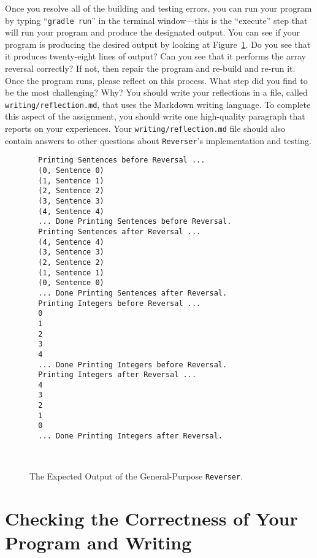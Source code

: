 \documentclass[11pt]{article}
\newcommand{\mainprogram}{\lstinline{Reverser}}
\newcommand{\mainprogramoutput}{twenty-eight}
\newcommand{\reflection}{\lstinline{writing/reflection.md}}
\newcommand{\gradlerun}{\command{gradle run}}
\newcommand{\command}[1]{``\lstinline{#1}''}
\begin{document}

Once you resolve all of the building and testing errors, you can run your
program by typing \gradlerun{} in the terminal window---this is the ``execute''
step that will run your program and produce the designated output. You can see
if your program is producing the desired output by looking at
Figure~\ref{fig:output}. Do you see that it produces \mainprogramoutput{} lines
of output? Can you see that it performs the array reversal correctly? If not,
then repair the program and re-build and re-run it. Once the program runs,
please reflect on this process. What step did you find to be the most
challenging? Why? You should write your reflections in a file, called
\reflection{}, that uses the Markdown writing language. To complete this aspect
of the assignment, you should write one high-quality paragraph that reports on
your experiences. Your \reflection{} file should also contain answers to other
questions about \mainprogram{}'s implementation and testing.

\begin{figure}[t]
  \centering
  \begin{verbatim}
  Printing Sentences before Reversal ...
  (0, Sentence 0)
  (1, Sentence 1)
  (2, Sentence 2)
  (3, Sentence 3)
  (4, Sentence 4)
  ... Done Printing Sentences before Reversal.
  Printing Sentences after Reversal ...
  (4, Sentence 4)
  (3, Sentence 3)
  (2, Sentence 2)
  (1, Sentence 1)
  (0, Sentence 0)
  ... Done Printing Sentences after Reversal.
  Printing Integers before Reversal ...
  0
  1
  2
  3
  4
  ... Done Printing Integers before Reversal.
  Printing Integers after Reversal ...
  4
  3
  2
  1
  0
  ... Done Printing Integers after Reversal.
  \end{verbatim}
  \vspace*{-.25in}
  \caption{The Expected Output of the General-Purpose \mainprogram{}.}~\label{fig:output}
  \vspace*{-.25in}
\end{figure}

\section*{Checking the Correctness of Your Program and Writing}
\end{document}
